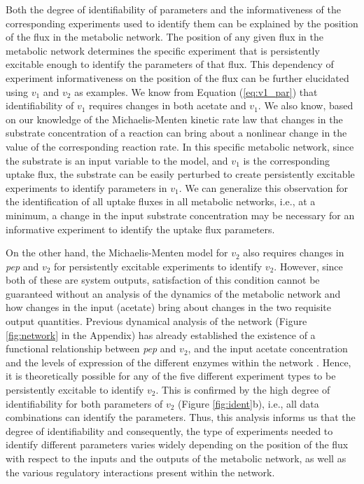 \documentclass[10pt]{article}
\begin{document}
	Both the degree of identifiability of parameters and the informativeness of the corresponding experiments used to identify them can be explained by the position of the flux in the metabolic network. The position of any given flux in the metabolic network determines the specific experiment that is persistently excitable enough to identify the parameters of that flux. This dependency of experiment informativeness on the position of the flux can be further elucidated using $v_1$ and $v_2$ as examples. We know from Equation (\ref{eq:v1_par}) that identifiability of $v_1$ requires changes in both acetate and $v_1$. We also know, based on our knowledge of the Michaelis-Menten kinetic rate law that changes in the substrate concentration of a reaction can bring about a nonlinear change in the value of the corresponding reaction rate. In this specific metabolic network, since the substrate is an input variable to the model, and $v_1$ is the corresponding uptake flux, the substrate can be easily perturbed to create persistently excitable experiments to identify parameters in $v_1$. We can generalize this observation for the identification of all uptake fluxes in all metabolic networks, i.e., at a minimum, a change in the input substrate concentration may be necessary for an informative experiment to identify the uptake flux parameters. 
	
	On the other hand, the Michaelis-Menten model for $v_2$ also requires changes in \textit{pep} and $v_2$ for persistently excitable experiments to identify $v_2$. However, since both of these are system outputs, satisfaction of this condition cannot be guaranteed without an analysis of the dynamics of the metabolic network and how changes in the input (acetate) bring about changes in the two requisite output quantities. Previous dynamical analysis of the network (Figure \ref{fig:network} in the Appendix) has already established the existence of a functional relationship between \textit{pep} and $v_2$, and the input acetate concentration and the levels of expression of the different enzymes within the network \parencite{Srinivasan2017}. Hence, it is theoretically possible for any of the five different experiment types to be persistently excitable to identify $v_2$. This is confirmed by the high degree of identifiability for both parameters of $v_2$ (Figure \ref{fig:ident}b), i.e., all data combinations can identify the parameters. Thus, this analysis informs us that the degree of identifiability and consequently, the type of experiments needed to identify different parameters varies widely depending on the position of the flux with respect to the inputs and the outputs of the metabolic network, as well as the various regulatory interactions present within the network. 
	
\end{document}
